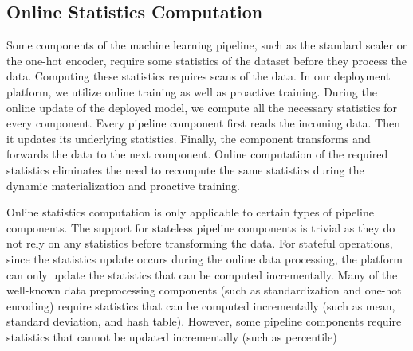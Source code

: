 \subsection{Online Statistics Computation}\label{online-statistics-computation}
Some components of the machine learning pipeline, such as the standard scaler or the one-hot encoder, require some statistics of the dataset before they process the data.
Computing these statistics requires scans of the data.
In our deployment platform, we utilize online training as well as proactive training.
During the online update of the deployed model, we compute all the necessary statistics for every component.
Every pipeline component first reads the incoming data.
Then it updates its underlying statistics.
Finally, the component transforms and forwards the data to the next component.
Online computation of the required statistics eliminates the need to recompute the same statistics during the dynamic materialization and proactive training.

Online statistics computation is only applicable to certain types of pipeline components.
The support for stateless pipeline components is trivial as they do not rely on any statistics before transforming the data.
For stateful operations, since the statistics update occurs during the online data processing, the platform can only update the statistics that can be computed incrementally.
Many of the well-known data preprocessing components (such as standardization and one-hot encoding) require statistics that can be computed incrementally (such as mean, standard deviation, and hash table).
However, some pipeline components require statistics that cannot be updated incrementally (such as percentile) 

